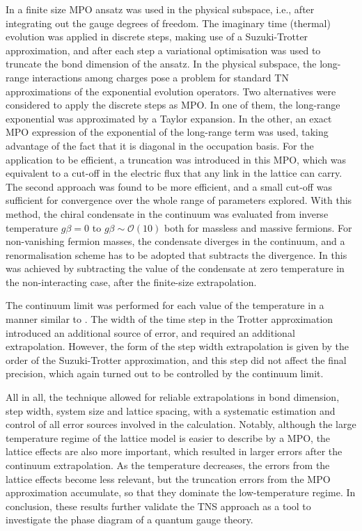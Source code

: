 \documentclass[epj,final]{svjour}
\begin{document}
In  \cite{Banuls2015,banuls2016thermalmass} a finite size MPO ansatz was used in the physical subspace, i.e., after integrating out the gauge degrees of freedom. The imaginary time (thermal) evolution was applied in discrete steps, making use of a Suzuki-Trotter approximation, and after each step a variational optimisation was used to truncate the bond dimension of the ansatz. In the physical subspace, the long-range interactions among charges pose a problem for standard TN approximations of the exponential evolution operators. Two alternatives were considered to apply the discrete steps as MPO. In one of them, the long-range exponential was approximated by a Taylor expansion. In the other, an exact MPO expression of the exponential of the long-range term was used, taking advantage of the fact that it is diagonal in the occupation basis. For the application to be efficient, a truncation was introduced in this MPO, which was equivalent to a cut-off in the electric flux that any link in the lattice can carry. The second approach was found to be more efficient, and a small cut-off was sufficient for convergence over the whole range of parameters explored. With this method, the chiral condensate in the continuum was evaluated from inverse temperature $g\beta=0$ to $g\beta \sim \mathcal{O}(10)$ both for massless and massive fermions. For non-vanishing fermion masses, the condensate diverges in the continuum, and a renormalisation scheme has to be adopted that subtracts the divergence. In \cite{banuls2016thermalmass} this was achieved by subtracting the value of the condensate at zero temperature in the non-interacting case, after the finite-size extrapolation.

The continuum limit was performed for each value of the temperature in a manner similar to \cite{Banuls2013}. The width of the time step in the Trotter approximation introduced an additional source of error, and required an additional extrapolation. However, the form of the step width extrapolation is given by the order of the Suzuki-Trotter approximation, and this step did not affect the final precision, which again turned out to be controlled by the continuum limit.

All in all, the technique allowed for reliable extrapolations in bond dimension, step width, system size and lattice spacing, with a systematic estimation and control of all error sources involved in the calculation. Notably, although the large temperature regime of the lattice model is easier to describe by a MPO, the lattice effects are also more important, which resulted in larger errors after the continuum extrapolation. As the temperature decreases, the errors from the lattice effects become less relevant, but the truncation errors from the MPO approximation accumulate, so that they dominate the low-temperature regime. In conclusion, these results further validate the TNS approach as a tool to investigate the phase diagram of a quantum gauge theory.
\end{document}
